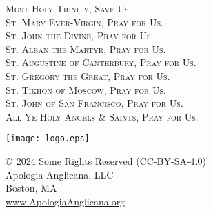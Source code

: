 \fancyhead[RE,LO]{}\fancyhead[RO,LE]{}\fancyhead[C]{}\thispagestyle{empty}
   \begin{center}
   	\textsc{
   	Most Holy Trinity, Save Us.\\
   	\small{
   	St. Mary Ever-Virgin, Pray for Us.\\
   	St. John the Divine, Pray for Us.\\
   	St. Alban the Martyr, Pray for Us.\\
   	St. Augustine of Canterbury, Pray for Us.\\
    St. Gregory the Great, Pray for Us.\\
    St. Tikhon of Moscow, Pray for Us.\\
    St. John of San Francisco, Pray for Us.\\
   	All Ye Holy Angels \& Saints, Pray for Us.
   	}
   	}
   	\vfill
   	\par
   	\texttt{[image: logo.eps]}
			\par
	$\copyright$ 2024 Some Rights Reserved (CC-BY-SA-4.0)\\
	Apologia Anglicana, LLC\\
    Boston, MA\\
	\url{www.ApologiaAnglicana.org}
   \end{center}